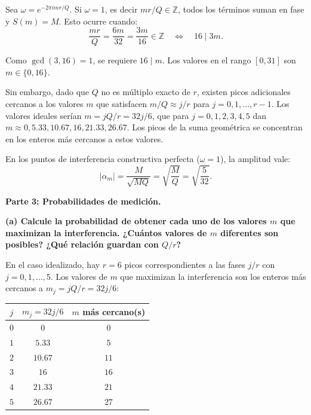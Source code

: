 Sea $\omega = e^{-2\pi i m r / Q}$. Si $\omega = 1$, es decir $mr/Q \in \mathbb{Z}$, todos los términos suman en fase y $S(m) = M$. Esto ocurre cuando:
$$
    \frac{mr}{Q} = \frac{6m}{32} = \frac{3m}{16} \in \mathbb{Z} \quad \Longleftrightarrow \quad 16 \mid 3m.
$$

Como $\gcd(3,16) = 1$, se requiere $16 \mid m$. Los valores en el rango $[0, 31]$ son $m \in \{0, 16\}$.

Sin embargo, dado que $Q$ no es múltiplo exacto de $r$, existen picos adicionales cercanos a los valores $m$ que satisfacen $m/Q \approx j/r$ para $j = 0, 1, \ldots, r-1$. Los valores ideales serían $m = jQ/r = 32j/6$, que para $j = 0, 1, 2, 3, 4, 5$ dan $m \approx 0, 5.33, 10.67, 16, 21.33, 26.67$. Los picos de la suma geométrica se concentran en los enteros más cercanos a estos valores.

En los puntos de interferencia constructiva perfecta ($\omega = 1$), la amplitud vale:
$$
    |\alpha_m| = \frac{M}{\sqrt{MQ}} = \sqrt{\frac{M}{Q}} = \sqrt{\frac{5}{32}}.
$$

\vspace{0.5cm}

{\bfseries Parte 3: Probabilidades de medición.}

{\bfseries (a) Calcule la probabilidad de obtener cada uno de los valores $m$ que maximizan la interferencia. ¿Cuántos valores de $m$ diferentes son posibles? ¿Qué relación guardan con $Q/r$?}

En el caso idealizado, hay $r = 6$ picos correspondientes a las fases $j/r$ con $j = 0, 1, \ldots, 5$. Los valores de $m$ que maximizan la interferencia son los enteros más cercanos a $m_j = jQ/r = 32j/6$:

\begin{center}
    \begin{tabular}{c|c|c}
        $j$ & $m_j = 32j/6$ & $m$ más cercano(s) \\ \hline
        $0$ & $0$           & $0$                \\
        $1$ & $5.33$        & $5$                \\
        $2$ & $10.67$       & $11$               \\
        $3$ & $16$          & $16$               \\
        $4$ & $21.33$       & $21$               \\
        $5$ & $26.67$       & $27$
    \end{tabular}
\end{center}

